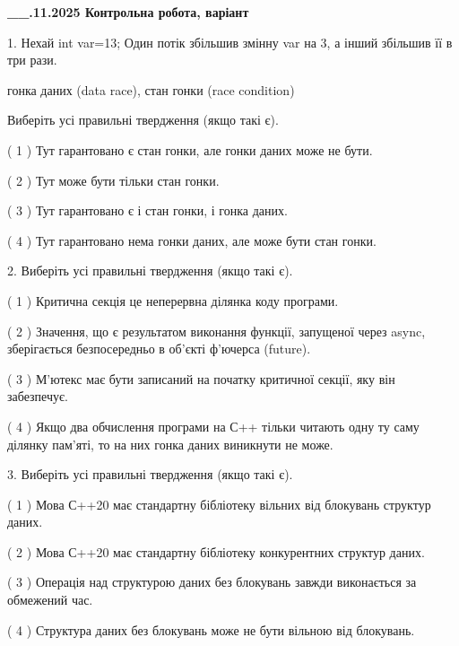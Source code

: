 \documentclass[12pt, ukrainian]{article}
\begin{document}
\newpage
\begin {large}

\textbf{\_\_.11.2025 Контрольна робота, варіант  }\par


{
1. Нехай int var=13; Один потік збільшив змінну var на 3, а інший збільшив її в три рази.

гонка даних (data race), стан гонки (race condition)

Виберіть усі правильні твердження (якщо такі є).\par
\vspace{2mm}
( 1 ) Тут гарантовано є стан гонки, але гонки даних може не бути.%

( 2 ) Тут може бути тільки стан гонки.%

( 3 ) Тут гарантовано є і стан гонки, і гонка даних.%

( 4 ) Тут гарантовано нема гонки даних, але може бути стан гонки.%


2. Виберіть усі правильні твердження (якщо такі є).\par
\vspace{2mm}

( 1 ) Критична секція це неперервна ділянка коду програми.%

( 2 ) Значення, що є результатом виконання функції, запущеної через async, зберігається безпосередньо в об’єкті ф’ючерса (future).%

( 3 ) М’ютекс має бути записаний на початку критичної секції, яку він забезпечує.%

( 4 ) Якщо два обчислення програми на С++ тільки читають одну ту саму ділянку пам'яті, то на них гонка даних  виникнути не може.%


3. Виберіть усі правильні твердження (якщо такі є).\par
\vspace{2mm}

( 1 ) Мова С++20 має стандартну бібліотеку вільних від блокувань структур даних.%

( 2 ) Мова С++20 має стандартну бібліотеку конкурентних структур даних.%

( 3 ) Операція над структурою даних без блокувань завжди виконається за обмежений час.%

( 4 ) Структура даних без блокувань може не бути вільною від блокувань.%


}
\end{large}
\end{document}
